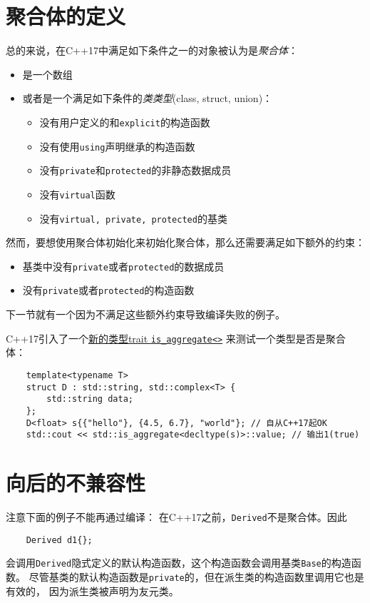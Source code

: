 \section{聚合体的定义}\label{ch4.3}
总的来说，在C++17中满足如下条件之一的对象被认为是\emph{聚合体}：
\begin{itemize}
    \item 是一个数组
    \item 或者是一个满足如下条件的\emph{类类型}(class, struct, union)：
    \begin{itemize}
        \item 没有用户定义的和\texttt{explicit}的构造函数
        \item 没有使用\texttt{using}声明继承的构造函数
        \item 没有\texttt{private}和\texttt{protected}的非静态数据成员
        \item 没有\texttt{virtual}函数
        \item 没有\texttt{virtual, private, protected}的基类
    \end{itemize}
\end{itemize}
然而，要想使用聚合体初始化来初始化聚合体，那么还需要满足如下额外的约束：
\begin{itemize}
    \item 基类中没有\texttt{private}或者\texttt{protected}的数据成员
    \item 没有\texttt{private}或者\texttt{protected}的构造函数
\end{itemize}
下一节就有一个因为不满足这些额外约束导致编译失败的例子。

C++17引入了一个\hyperref[ch21.2.1]{新的类型trait \texttt{is\_aggregate<>}}
来测试一个类型是否是聚合体：
\begin{lstlisting}
    template<typename T>
    struct D : std::string, std::complex<T> {
        std::string data;
    };
    D<float> s{{"hello"}, {4.5, 6.7}, "world"}; // 自从C++17起OK
    std::cout << std::is_aggregate<decltype(s)>::value; // 输出1(true)
\end{lstlisting}

\section{向后的不兼容性}
注意下面的例子不能再通过编译：
在C++17之前，\texttt{Derived}不是聚合体。因此
\begin{lstlisting}
    Derived d1{};
\end{lstlisting}
会调用\texttt{Derived}隐式定义的默认构造函数，这个构造函数会调用基类\texttt{Base}的构造函数。
尽管基类的默认构造函数是\texttt{private}的，但在派生类的构造函数里调用它也是有效的，
因为派生类被声明为友元类。

